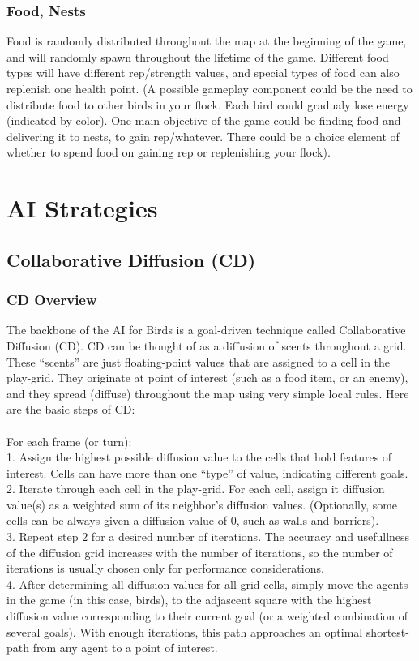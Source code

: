 \documentclass{article}
\begin{document}
\subsubsection*{Food, Nests}
Food is randomly distributed throughout the map at the beginning of the game, and will randomly spawn throughout the lifetime of the game.  Different food types will have different rep/strength values, and special types of food can also replenish one health point. (A possible gameplay component could be the need to distribute food to other birds in your flock.  Each bird could gradualy lose energy (indicated by color).  One main objective of the game could be finding food and delivering it to nests, to gain rep/whatever.  There could be a choice element of whether to spend food on gaining rep or replenishing your flock).

\section*{AI Strategies}
\subsection*{Collaborative Diffusion (CD)}
\subsubsection*{CD Overview}
The backbone of the AI for Birds is a goal-driven technique called Collaborative Diffusion (CD).  CD can be thought of as a diffusion of scents throughout a grid.  These ``scents'' are just floating-point values that are assigned to a cell in the play-grid.  They originate at point of interest (such as a food item, or an enemy), and they spread (diffuse) throughout the map using very simple local rules.  Here are the basic steps of CD:
\\\\
For each frame (or turn):
\\
1. Assign the highest possible diffusion value to the cells that hold features of interest.  Cells can have more than one ``type'' of value, indicating different goals.
\\
2. Iterate through each cell in the play-grid.  For each cell, assign it diffusion value(s) as a weighted sum of its neighbor's diffusion values. (Optionally, some cells can be always given a diffusion value of $0$, such as walls and barriers).
\\
3. Repeat step 2 for a desired number of iterations.  The accuracy and usefullness of the diffusion grid increases with the number of iterations, so the number of iterations is usually chosen only for performance considerations.
\\
4. After determining all diffusion values for all grid cells, simply move the agents in the game (in this case, birds), to the adjascent square with the highest diffusion value corresponding to their current goal (or a weighted combination of several goals).  With enough iterations, this path approaches an optimal shortest-path from any agent to a point of interest.
\end{document}
